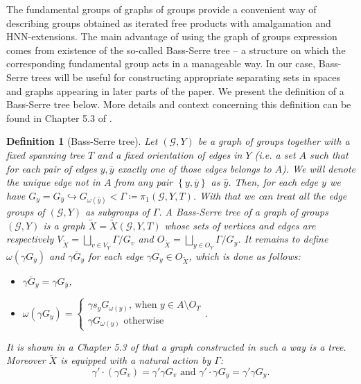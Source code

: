 \documentclass[12pt, a4paper]{article}
\newcommand{\8}{\infty}
\newcommand{\set}[1]{\left\{ #1 \right\}}
\theoremstyle{break}
\theoremstyle{defbreak}
\newtheorem{df}[thm]{Definition}
\newcommand{\ol}[1]{\overline{#1}}
\newcommand{\wtl}[1]{\widetilde{#1}}
\begin{document}
The fundamental groups of graphs of groups provide a convenient way of describing groups obtained as iterated free products with amalgamation and HNN-extensions. The main advantage of using the graph of groups expression comes from existence of the so-called Bass-Serre tree -- a structure on which the corresponding fundamental group acts in a manageable way. In our case, Bass-Serre trees will be useful for constructing appropriate separating sets in spaces and graphs appearing in later parts of the paper. We present the definition of a Bass-Serre tree below.  More details and  context concerning this definition can be found in Chapter 5.3 of \cite{serre-trees}.\medskip

\begin{df}[Bass-Serre tree]
     Let $(\mathcal{G},Y)$ be a graph of groups together with a fixed spanning tree $T$ and a fixed orientation of edges in $Y$ (i.e. a set $A$ such that for each pair of edges $y,\ol{y}$ exactly one of those edges belongs to $A$). We will denote the unique edge not in $A$ from any pair $\set{y, \ol{y}}$ as $\hat{y}$. Then, for each edge $y$ we have $G_y = G_{\hat{y}} \hookrightarrow G_{\omega(\hat{y})}<\Gamma \coloneqq \pi_1(\mathcal{G},Y,T)$. With that we can treat all the edge groups of $(\mathcal{G},Y)$ as subgroups of $\Gamma$. A \textit{Bass-Serre tree} of a graph of groups $(\mathcal{G},Y)$ is a graph $\wtl{X} = \wtl{X}(\mathcal{G},Y,T)$ whose sets of vertices and edges are respectively  $V_{\wtl{X}} = \bigsqcup_{v\in V_Y}\Gamma/G_v$ and $O_{\wtl{X}} = \bigsqcup_{y\in O_Y}\Gamma/G_{y}$. 
     It remains to define $\omega(\gamma G_y)$ and $\ol{\gamma G_y}$ for each edge $\gamma G_y\in O_{\wtl{X}}$, which is done as follows:
     \begin{itemize}
         \item $\ol{\gamma G_{y}} = \gamma G_{\ol{y}}$,
         \item $\omega(\gamma G_{y}) = \begin{cases}
             \gamma s_{y}G_{\omega(y)}\text{, when }y\in A\setminus O_T\\
             \gamma G_{\omega(y)}\text{ otherwise}
         \end{cases}$.
     \end{itemize}
     It is shown in a Chapter 5.3 of \cite{serre-trees} that a graph constructed in such a way is a tree. Moreover $\wtl{X}$ is equipped with a natural action by $\Gamma$:
     $$\gamma'\cdot (\gamma G_v) = \gamma'\gamma G_v \text{ and }\gamma'\cdot \gamma G_{y} = \gamma'\gamma G_{y}.$$
\end{df}
\end{document}
